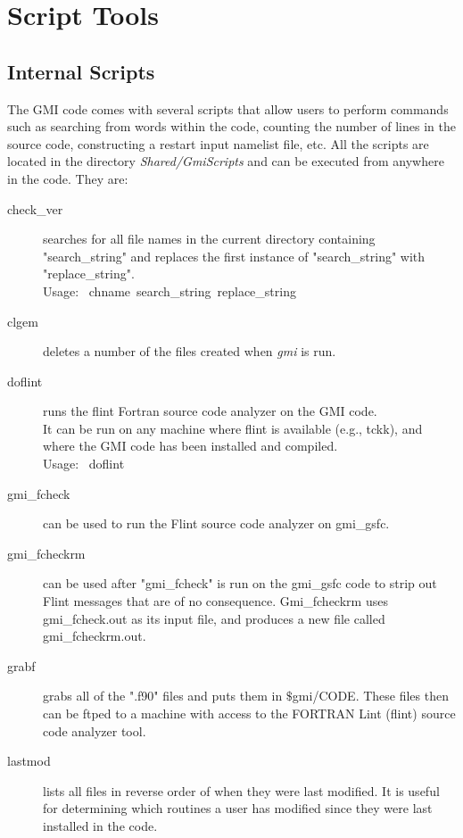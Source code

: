 
\chapter[Script Tools]{Script Tools} \label{chap:script}

\section{Internal Scripts} \label{section:internal}
The GMI code comes with several scripts that allow users to perform 
commands such as searching from words within the code, counting the
number of lines in the source code, constructing a restart input
namelist file, etc.
%
All the scripts are located in the directory
{\em Shared/GmiScripts} and can be executed from
anywhere in the code. They are:
%
\begin{description}
\item[check\_ver] searches for all file names in the current directory
   containing "search\_string" and replaces the first instance of
   "search\_string" with "replace\_string". \\
   Usage:  \mbox{ chname  search\_string  replace\_string}
\item[clgem] deletes a number of the files created when {\em gmi} is run.
\item[doflint] runs the flint Fortran source code analyzer on the GMI code. \\
   It can be run on any machine where flint is available (e.g., tckk), and
   where the GMI code has been installed and compiled. \\
   Usage: \mbox{ doflint }
\item[gmi\_fcheck] can be used to run the Flint source code analyzer on
   gmi\_gsfc.
\item[gmi\_fcheckrm] can be used after "gmi\_fcheck" is run on the gmi\_gsfc
   code to strip out Flint messages that are of no consequence.  
   Gmi\_fcheckrm uses gmi\_fcheck.out as its input file, and produces a new 
   file called gmi\_fcheckrm.out.  
\item[grabf] grabs all of the ".f90" files and puts them in $\$$gmi/CODE.
   These files then can be ftped to a machine with access to the FORTRAN
   Lint (flint) source code analyzer tool.
\item[lastmod] lists all files in reverse order of 
   when they were last modified. It is useful for determining which 
   routines a user has modified since they were last installed in the code. \\

\end{description}
